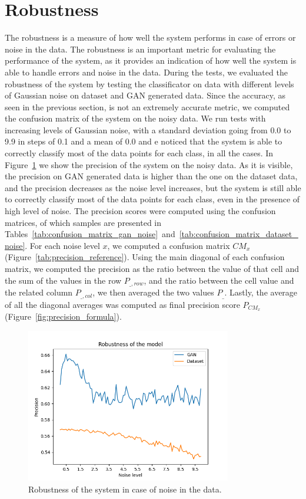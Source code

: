 \section{Robustness}
The robustness is a measure of how well the system performs in case of errors or noise in the data.
The robustness is an important metric for evaluating the performance of the system, as it provides an indication of how well the system is able to handle errors and noise in the data.
During the tests, we evaluated the robustness of the system by testing the classificator on data with different levels of Gaussian noise on dataset and GAN generated data.
Since the accuracy, as seen in the previous section, is not an extremely accurate metric, we computed the confusion matrix of the system on the noisy data.
We run tests with increasing levels of Gaussian noise, with a standard deviation going from 0.0 to 9.9 in steps of 0.1 and a mean of 0.0 and e noticed that the system is able to correctly classify most of the data points for each class, in all the cases.
In Figure~\ref{fig:robustness} we show the precision of the system on the noisy data.
As it is visible, the precision on GAN generated data is higher than the one on the dataset data, and the precision decreases as the noise level increases, but the system is still able to correctly classify most of the data points for each class, even in the presence of high level of noise.
The precision scores were computed using the confusion matrices, of which samples are presented in Tables~\ref{tab:confusion_matrix_gan_noise}~and~\ref{tab:confusion_matrix_dataset_noise}.
For each noise level $x$, we computed a confusion matrix $CM_x$ (Figure~\ref{tab:precision_reference}).
Using the main diagonal of each confusion matrix, we computed the precision as the ratio between the value of that cell and the sum of the values in the row $P_{\_, row}$, and the ratio between the cell value and the related column $P_{\_, col}$, we then averaged the two values $P_{\_}$.
Lastly, the average of all the diagonal averages was computed as final precision score $P_{CM_x}$ (Figure~\ref{fig:precision_formula}).

\begin{figure}[!htbp]
    \centering
    \includegraphics[width=0.8\textwidth]{Figures/Testing/robustness_plot}
    \caption{Robustness of the system in case of noise in the data.}\label{fig:robustness}
\end{figure}


